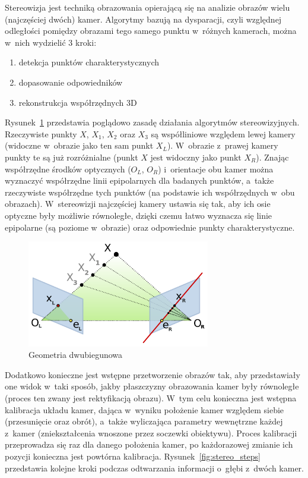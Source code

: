 Stereowizja jest techniką obrazowania opierającą się na analizie obrazów wielu
(najczęściej dwóch) kamer. Algorytmy bazują na dysparacji, czyli względnej
odległości pomiędzy obrazami tego samego punktu w~różnych kamerach, można 
w~nich wydzielić 3 kroki:

\begin{enumerate}
\item detekcja punktów charakterystycznych
\item dopasowanie odpowiedników
\item rekonstrukcja współrzędnych 3D
\end{enumerate}

Rysunek~\ref{fig:epipolar} przedstawia poglądowo zasadę działania algorytmów
stereowizyjnych. Rzeczywiste punkty $X$, $X_1$, $X_2$ oraz $X_3$ są współliniowe
względem lewej kamery (widoczne w~obrazie jako ten sam punkt $X_L$). W~obrazie 
z~prawej kamery punkty te są już rozróżnialne (punkt $X$ jest widoczny jako punkt
$X_R$). Znając współrzędne środków optycznych ($O_L$, $O_R$) i~orientacje obu
kamer można wyznaczyć współrzędne linii epipolarnych dla badanych punktów, 
a~także rzeczywiste współrzędne tych punktów (na podstawie ich współrzędnych 
w~obu obrazach). W~stereowizji najczęściej kamery ustawia się tak, aby ich osie
optyczne były możliwie równoległe, dzięki czemu łatwo wyznacza się linie
epipolarne (są poziome w~obrazie) oraz odpowiednie punkty charakterystyczne.

\begin{figure}[h!]
\centering
\includegraphics[width=8cm]{../../Common/img/Epipolar_geometry}
\caption{Geometria dwubiegunowa}
\label{fig:epipolar}
\end{figure}

Dodatkowo konieczne jest wstępne przetworzenie obrazów tak, aby przedstawiały
one widok w~taki sposób, jakby płaszczyzny obrazowania kamer były równoległe
(proces ten zwany jest rektyfikacją obrazu). W~tym celu konieczna jest wstępna
kalibracja układu kamer, dająca w~wyniku położenie kamer względem siebie
(przesunięcie oraz obrót), a~także wyliczająca parametry wewnętrzne każdej 
z~kamer (zniekształcenia wnoszone przez soczewki obiektywu). Proces kalibracji
przeprowadza się raz dla danego położenia kamer, po każdorazowej zmianie ich
pozycji konieczna jest powtórna kalibracja. Rysunek~\ref{fig:stereo_steps}
przedstawia kolejne kroki podczas odtwarzania informacji o~głębi z~dwóch kamer.

